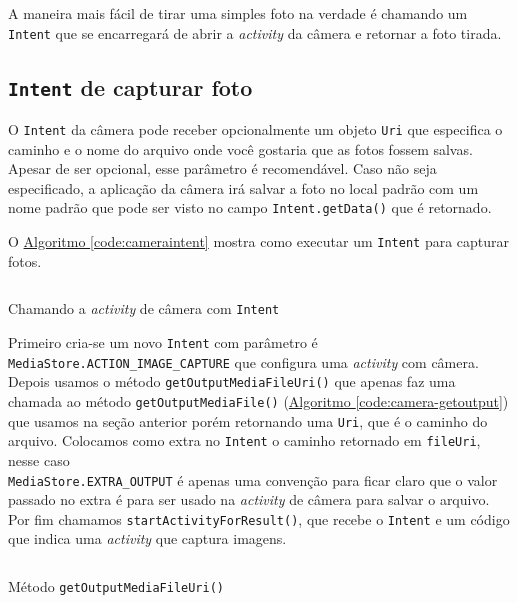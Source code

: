 \documentclass[a4paper,12pt,brazil,oneside]{book}
\begin{document}
		A maneira mais fácil de tirar uma simples foto na verdade é chamando um \texttt{Intent} que se encarregará de abrir a \emph{activity} da câmera e retornar a foto tirada.

	\subsection{\texttt{Intent} de capturar foto}
		
		O \texttt{Intent} da câmera pode receber opcionalmente um objeto \texttt{Uri} que especifica o caminho e o nome do arquivo onde você gostaria que as fotos fossem salvas. Apesar de ser opcional, esse parâmetro é recomendável. Caso não seja especificado, a aplicação da câmera irá salvar a foto no local padrão com um nome padrão que pode ser visto no campo \texttt{Intent.getData()} que é retornado.

		O \hyperref[code:cameraintent]{Algoritmo \ref*{code:cameraintent}} mostra como executar um \texttt{Intent} para capturar fotos.

		\begin{listing}[H]
		\inputminted[linenos=true,fontsize=\small,frame=lines, framesep=2mm, tabsize=2,numbersep=5pt]{java}{src/api/camera/captureintent.java}
		\caption{Chamando a \emph{activity} de câmera com \texttt{Intent}}
		\label{code:cameraintent}
		\end{listing} 		

		Primeiro cria-se um novo \texttt{Intent} com parâmetro é \texttt{MediaStore.ACTION\_IMAGE\_CAPTURE} que configura uma \emph{activity} com câmera. Depois usamos o método \texttt{getOutputMediaFileUri()} que apenas faz uma chamada ao método \texttt{getOutputMediaFile()} (\hyperref[code:camera-getoutput]{Algoritmo \ref*{code:camera-getoutput}}) que usamos na seção anterior porém retornando uma \texttt{Uri}, que é o caminho do arquivo. Colocamos como extra no \texttt{Intent} o caminho retornado em \texttt{fileUri}, nesse caso \\ \texttt{MediaStore.EXTRA\_OUTPUT} é apenas uma convenção para ficar claro que o valor passado no extra é para ser usado na \emph{activity} de câmera para salvar o arquivo. Por fim chamamos \texttt{startActivityForResult()}, que recebe o \texttt{Intent} e um código que indica uma \emph{activity} que captura imagens.

		\begin{listing}[H]
		\inputminted[linenos=true,fontsize=\small,frame=lines, framesep=2mm, tabsize=2,numbersep=5pt]{java}{src/api/camera/urifromfile.java}
		\caption{Método \texttt{getOutputMediaFileUri()}}
		\label{code:urifromfile}
		\end{listing} 		
\end{document}
